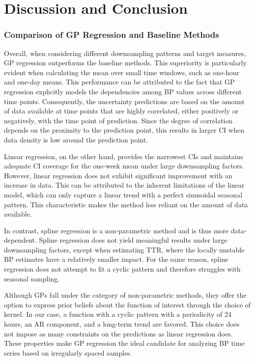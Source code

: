 \chapter{Discussion and Conclusion}\label{ch:discussion-and-conclusion}

\subsection{Comparison of GP Regression and Baseline Methods}

Overall, when considering different downsampling patterns and target measures,
GP regression outperforms the baseline methods. This superiority is particularly
evident when calculating the mean over small time windows, such as one-hour and one-day means.
This performance can be attributed to the fact that GP regression explicitly models
the dependencies among BP values across different time points. Consequently,
the uncertainty predictions are based on the amount of data available at time
points that are highly correlated, either positively or negatively, with the time
point of prediction.
Since the degree of correlation depends on the proximity to the prediction point,
this results in larger CI when data density is low around the prediction point.

Linear regression, on the other hand, provides the narrowest CIs and maintains adequate
CI coverage for the one-week mean under large downsampling factors. However,
linear regression does not exhibit significant improvement with an increase in data.
This can be attributed to the inherent
limitations of the linear model, which can only capture a linear trend with a perfect sinusoidal
seasonal pattern. This characteristic makes the method less reliant on the amount of data available.

In contrast, spline regression is a non-parametric method and is thus more data-dependent.
Spline regression does not yield meaningful results under large downsampling factors,
except when estimating TTR, where the locally unstable BP estimates have a relatively smaller impact.
For the same reason, spline regression does not attempt to fit a cyclic pattern and therefore struggles with seasonal sampling.

Although GPs fall under the category of non-parametric methods, they offer the option to express
prior beliefs about the function of interest through the choice of kernel.
In our case, a function with a cyclic pattern with a periodicity of 24 hours, an AR component, and a long-term trend are favored.
This choice does not impose as many constraints on the predictions as linear regression does.
These properties make GP regression the ideal candidate for analyzing BP time series based on irregularly spaced samples.


